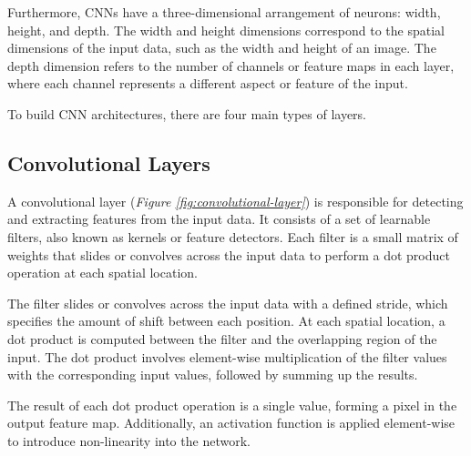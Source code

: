 Furthermore, CNNs have a three-dimensional arrangement of neurons: width,
height, and depth. The width and height dimensions correspond to the spatial
dimensions of the input data, such as the width and height of an image. The
depth dimension refers to the number of channels or feature maps in each layer,
where each channel represents a different aspect or feature of the input.
\newline

To build CNN architectures, there are four main types of layers.

\subsection{Convolutional Layers}

A convolutional layer (\textit{Figure \ref{fig:convolutional-layer}}) is
responsible for detecting and extracting features from the input data. It
consists of a set of learnable filters, also known as kernels or feature
detectors. Each filter is a small matrix of weights that slides or convolves
across the input data to perform a dot product operation at each spatial
location.  \newline

The filter slides or convolves across the input data with a defined stride,
which specifies the amount of shift between each position. At each spatial
location, a dot product is computed between the filter and the overlapping
region of the input. The dot product involves element-wise multiplication of
the filter values with the corresponding input values, followed by summing up
the results. \newline

The result of each dot product operation is a single value, forming a pixel in
the output feature map. Additionally, an activation function is applied
element-wise to introduce non-linearity into the network. \newline

\newpage

